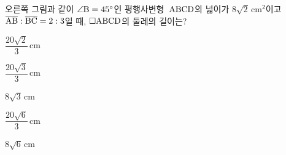 \noindent\begin{minipage}[t]{0.58\linewidth}\vspace{0pt}\raggedright 오른쪽 그림과 같이 $\angle\mathrm{B}=45^\circ$인 평행사변형~$\mathrm{ABCD}$의 넓이가 $8\sqrt{2}\,\mathrm{cm}^2$이고 $\overline{\mathrm{AB}}:\overline{\mathrm{BC}}=2:3$일 때, $\square\mathrm{ABCD}$의 둘레의 길이는?\end{minipage}\hfill\begin{minipage}[t]{0.4\linewidth}\vspace{0pt}\centering \resizebox{\ifdim\width>\linewidth\linewidth\else\width\fi}{!}{}\end{minipage}\par
\begin{choices32}{\rule[-3ex]{0pt}{8ex}$\dfrac{20\sqrt{2}}{3}\,\mathrm{cm}$}{\rule[-3ex]{0pt}{8ex}$\dfrac{20\sqrt{3}}{3}\,\mathrm{cm}$}{\rule[-3ex]{0pt}{8ex}$8\sqrt{3}\,\mathrm{cm}$}{\rule[-3ex]{0pt}{8ex}$\dfrac{20\sqrt{6}}{3}\,\mathrm{cm}$}{\rule[-3ex]{0pt}{8ex}$8\sqrt{6}\,\mathrm{cm}$}\end{choices32}
